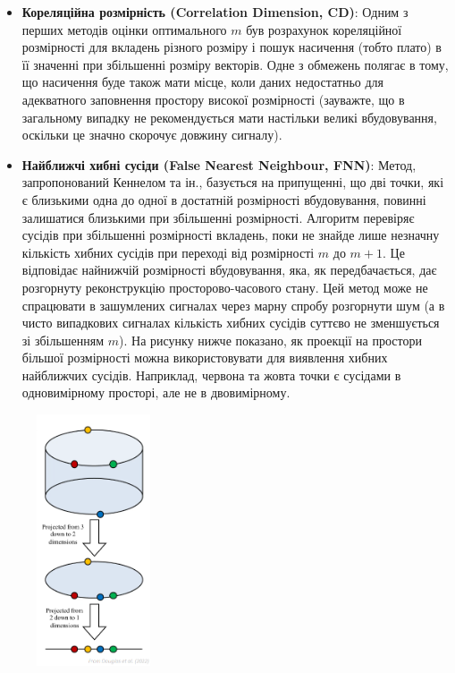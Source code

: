 \documentclass[
  letterpaper,
]{report}
\providecommand{\tightlist}{%
  \setlength{\itemsep}{0pt}\setlength{\parskip}{0pt}}\usepackage{longtable,booktabs,array}
\begin{document}
\begin{itemize}
\tightlist
\item
  \textbf{Кореляційна розмірність (Correlation Dimension, CD)}: Одним з
  перших методів оцінки оптимального \(m\) був розрахунок кореляційної
  розмірності для вкладень різного розміру і пошук насичення (тобто
  плато) в її значенні при збільшенні розміру векторів. Одне з обмежень
  полягає в тому, що насичення буде також мати місце, коли даних
  недостатньо для адекватного заповнення простору високої розмірності
  (зауважте, що в загальному випадку не рекомендується мати настільки
  великі вбудовування, оскільки це значно скорочує довжину сигналу).
\item
  \textbf{Найближчі хибні сусіди (False Nearest Neighbour, FNN)}: Метод,
  запропонований Кеннелом та ін., базується на припущенні, що дві точки,
  які є близькими одна до одної в достатній розмірності вбудовування,
  повинні залишатися близькими при збільшенні розмірності. Алгоритм
  перевіряє сусідів при збільшенні розмірності вкладень, поки не знайде
  лише незначну кількість хибних сусідів при переході від розмірності
  \(m\) до \(m+1\). Це відповідає найнижчій розмірності вбудовування,
  яка, як передбачається, дає розгорнуту реконструкцію
  просторово-часового стану. Цей метод може не спрацювати в зашумлених
  сигналах через марну спробу розгорнути шум (а в чисто випадкових
  сигналах кількість хибних сусідів суттєво не зменшується зі
  збільшенням \(m\)). На рисунку нижче показано, як проекції на простори
  більшої розмірності можна використовувати для виявлення хибних
  найближчих сусідів. Наприклад, червона та жовта точки є сусідами в
  одновимірному просторі, але не в двовимірному.
\end{itemize}

\begin{figure}

{\centering \includegraphics[width=0.3\textwidth,height=\textheight]{Images/lab_2/douglas2022b.png}

}

\end{figure}
\end{document}
